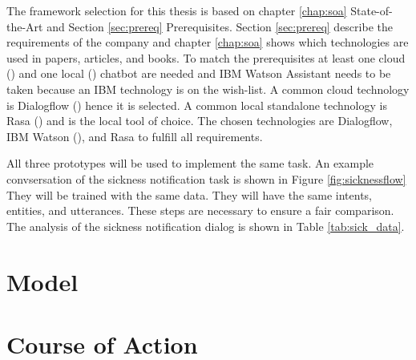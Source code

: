The framework selection for this thesis is based on chapter \ref{chap:soa} State-of-the-Art and Section \ref{sec:prereq} Prerequisites.
Section \ref{sec:prereq} describe the requirements of the company and chapter \ref{chap:soa} shows which technologies are 
used in papers, articles, and books.
To match the prerequisites at least one cloud (\citet{braunEvaluatingNLU, rahman2017programming}) and one local (\citet{braunEvaluatingNLU}) chatbot are needed and IBM Watson Assistant needs to be taken because an IBM technology is on the wish-list.
A common cloud technology is Dialogflow (\citet{braunEvaluatingNLU, dutta2017developing, singhbuilding, buiildChatbotsPython, rahman2017programming, ieee2018watson}) hence it is selected.
A common local standalone technology is Rasa (\citet{braunEvaluatingNLU, singhbuilding, rasabocklisch2017, buiildChatbotsPython, gregori2017evaluation}) and is the local tool of choice.
The chosen technologies are Dialogflow, IBM Watson (\citet{rahman2017programming, pharmacybot, ieee2018watson, gregori2017evaluation}), and Rasa to fulfill all requirements.

All three prototypes will be used to implement the same task.
An example convsersation of the sickness notification task is shown in Figure \ref{fig:sicknessflow}
They will be trained with the same data.
They will have the same intents, entities, and utterances.
These steps are necessary to ensure a fair comparison.
The analysis of the sickness notification dialog is shown in Table \ref{tab:sick_data}.


\section{Model}


\section{Course of Action} %
